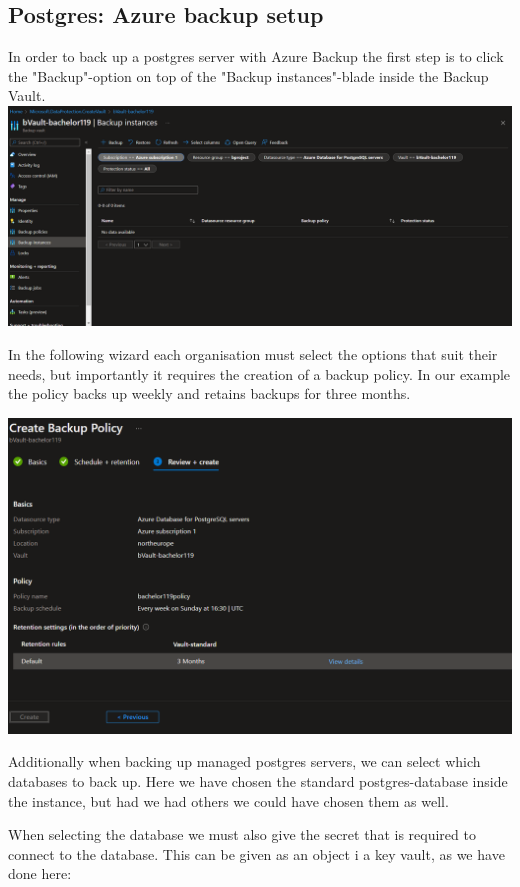\subsection{Postgres: Azure backup setup}
\label{pg_azurebackup}

In order to back up a postgres server with Azure Backup the first step is to click the "Backup"-option on top of the "Backup instances"-blade inside the Backup Vault.
\includegraphics[width=15cm, keepaspectratio]{figures/postgresaasmund/2.PNG}

In the following wizard each organisation must select the options that suit their needs, but importantly it requires the creation of a backup policy. In our example the policy backs up weekly and retains backups for three months. 

\includegraphics[width=15cm, keepaspectratio]{figures/postgresaasmund/3.PNG}

Additionally when backing up managed postgres servers, we can select which databases to back up. Here we have chosen the standard postgres-database inside the instance, but had we had others we could have chosen them as well. 

When selecting the database we must also give the secret that is required to connect to the database. This can be given as an object i a key vault, as we have done here:

